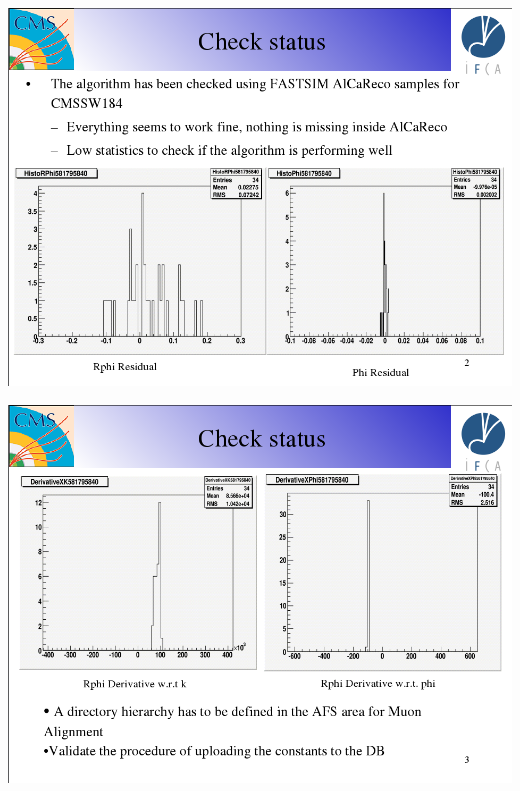 \documentclass[compress]{beamer}
\begin{document}
\begin{frame}
\mbox{\hspace{-1 cm}\includegraphics[width=1.2\linewidth]{pablo1.png}}
\end{frame}

\begin{frame}
\mbox{\hspace{-1 cm}\includegraphics[width=1.2\linewidth]{pablo2.png}}
\end{frame}
\end{document}
